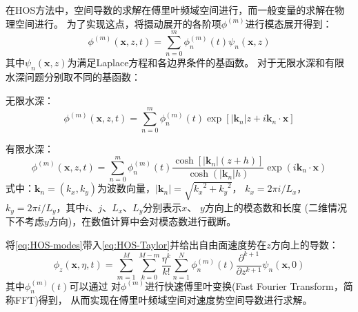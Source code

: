 在HOS方法中，空间导数的求解在傅里叶频域空间进行，而一般变量的求解在物理空间进行。%
为了实现这点，将摄动展开的各阶项$\phi^{\left(m\right)}$进行模态展开得到：
\begin{equation}
  \phi^{\left(m\right)}\left(\bm{x},z,t\right) = \sum_{n=0}^{m}\phi_n^{\left(m\right)}\left(t\right) %
  \psi_n\left(\bm{x},z\right)
  \label{eq:HOS-modes}
\end{equation}
其中$\psi_n\left(\bm{x},z\right)$为满足Laplace方程和各边界条件的基函数。%
对于无限水深和有限水深问题分别取不同的基函数：

无限水深：
\begin{equation}
  \phi^{\left(m\right)}\left(\bm{x},z,t\right) = \sum_{n=0}^{m} \phi_n^{\left(m\right)}\left(t\right) %
  \exp\left[\left|\bm{k}_n\right|z + i\bm{k}_n\cdot \bm{x}\right]
\end{equation}

有限水深：
\begin{equation}
  \phi^{\left(m\right)}\left(\bm{x},z,t\right) = \sum_{n=0}^{m} \phi_n^{\left(m\right)}\left(t\right) %
  \frac{\cosh\left[\left|\bm{k}_n\right|\left(z + h\right)\right]}{\cosh\left(\left|\bm{k}_n\right|h\right)}%
  \exp\left(i\bm{k}_n\cdot \bm{x}\right)
\end{equation}
式中：$\bm{k}_n = \left(k_x,k_y\right)$为波数向量，$\left|\bm{k}_n\right| = \sqrt{{k_x}^2 + {k_y}^2}$，%
$k_x = 2\pi i/L_x$，$k_y = 2\pi i/L_y$，其中$i$、$j$、$L_x$、$L_y$分别表示$x$、 $y$方向上的模态数和长度%
(二维情况下不考虑$y$方向)，在数值计算中会对模态数进行截断。

将\cref{eq:HOS-modes}带入\cref{eq:HOS-Taylor}并给出自由面速度势在$z$方向上的导数：
\begin{equation}
  \phi_z\left(\bm{x},\eta,t\right) = \sum_{m=1}^{M}\sum_{k=0}^{M-m}\frac{\eta^k}{k!}%
  \sum_{n=1}^{N} \phi_n^{\left(m\right)}\left(t\right) \frac{\partial^{k+1}}{\partial z^{k+1}}%
  \psi_n\left(\bm{x},0\right)
  \label{eq:HOS-derivative-z}
\end{equation}
其中$\phi_n^{\left(m\right)}\left(t\right)$可以通过%
对$\phi^{\left(m\right)}$进行快速傅里叶变换(Fast Fourier Transform，简称FFT)得到，%
从而实现在傅里叶频域空间对速度势空间导数进行求解。

